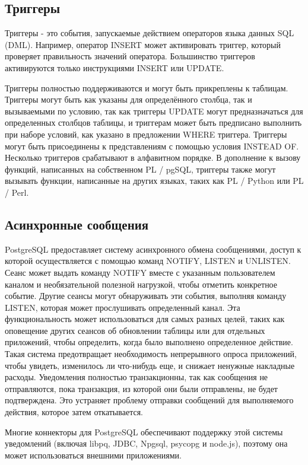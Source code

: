 \subsection{Триггеры}\label{sec:subs7}
Триггеры - это события, запускаемые действием операторов языка данных SQL (DML). Например, оператор INSERT может активировать триггер, который проверяет правильность значений оператора. Большинство триггеров активируются только инструкциями INSERT или UPDATE.

Триггеры полностью поддерживаются и могут быть прикреплены к таблицам. Триггеры могут быть как указаны для определённого столбца, так и вызываемыми по условию, так как триггеры UPDATE могут предназначаться для определенных столбцов таблицы, и триггерам может быть предписано выполнить при наборе условий, как указано в предложении WHERE триггера. Триггеры могут быть присоединены к представлениям с помощью условия INSTEAD OF. Несколько триггеров срабатывают в алфавитном порядке. В дополнение к вызову функций, написанных на собственном PL / pgSQL, триггеры также могут вызывать функции, написанные на других языках, таких как PL / Python или PL / Perl.


\subsection{Асинхронные сообщения}\label{sec:subs8}
PostgreSQL предоставляет систему асинхронного обмена сообщениями, доступ к которой осуществляется с помощью команд NOTIFY, LISTEN и UNLISTEN. Сеанс может выдать команду NOTIFY вместе с указанным пользователем каналом и необязательной полезной нагрузкой, чтобы отметить конкретное событие. Другие сеансы могут обнаруживать эти события, выполняя команду LISTEN, которая может прослушивать определенный канал. Эта функциональность может использоваться для самых разных целей, таких как оповещение других сеансов об обновлении таблицы или для отдельных приложений, чтобы определить, когда было выполнено определенное действие. Такая система предотвращает необходимость непрерывного опроса приложений, чтобы увидеть, изменилось ли что-нибудь еще, и снижает ненужные накладные расходы. Уведомления полностью транзакционны, так как сообщения не отправляются, пока транзакция, из которой они были отправлены, не будет подтверждена. Это устраняет проблему отправки сообщений для выполняемого действия, которое затем откатывается.


Многие коннекторы для PostgreSQL обеспечивают поддержку этой системы уведомлений (включая libpq, JDBC, Npgsql, psycopg и node.js), поэтому она может использоваться внешними приложениями.


